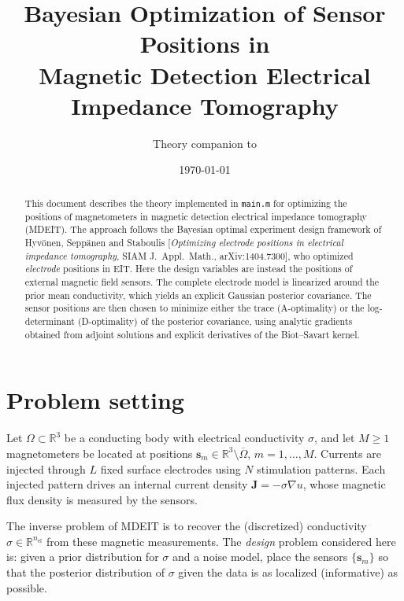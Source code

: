 \documentclass[11pt,a4paper]{article}
\title{Bayesian Optimization of Sensor Positions in\\
Magnetic Detection Electrical Impedance Tomography}
\author{Theory companion to \code{studies/optimal\_sensors\_bayesian\_approach/main.m}}
\date{\today}
\newcommand{\R}{\mathbb{R}}
\newcommand{\sensor}[1]{\bm{s}_{#1}}
\newcommand{\code}[1]{\texttt{#1}}
\begin{document}
\maketitle

\begin{abstract}
This document describes the theory implemented in \code{main.m} for optimizing the positions of
magnetometers in magnetic detection electrical impedance tomography (MDEIT). The approach follows
the Bayesian optimal experiment design framework of Hyv\"onen, Sepp\"anen and Staboulis
[\emph{Optimizing electrode positions in electrical impedance tomography}, SIAM J.\ Appl.\ Math.,
arXiv:1404.7300], who optimized \emph{electrode} positions in EIT. Here the design variables are
instead the positions of external magnetic field sensors. The complete electrode model is
linearized around the prior mean conductivity, which yields an explicit Gaussian posterior
covariance. The sensor positions are then chosen to minimize either the trace
(A-optimality) or the log-determinant (D-optimality) of the posterior covariance, using analytic
gradients obtained from adjoint solutions and explicit derivatives of the Biot--Savart kernel.
\end{abstract}

\section{Problem setting}

Let $\Omega \subset \R^3$ be a conducting body with electrical conductivity $\sigma$, and let
$M \geq 1$ magnetometers be located at positions $\sensor{m} \in \R^3 \setminus \overline{\Omega}$,
$m = 1,\dots,M$. Currents are injected through $L$ fixed surface electrodes using $N$ stimulation
patterns. Each injected pattern drives an internal current density
$\bm{J} = -\sigma \nabla u$, whose magnetic flux density is measured by the sensors.

The inverse problem of MDEIT is to recover the (discretized) conductivity
$\sigma \in \R^{n_{\mathrm{el}}}$ from these magnetic measurements. The \emph{design} problem
considered here is: given a prior distribution for $\sigma$ and a noise model, place the sensors
$\{\sensor{m}\}$ so that the posterior distribution of $\sigma$ given the data is as
localized (informative) as possible.
\end{document}

